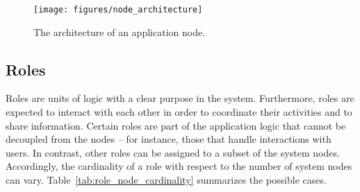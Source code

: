 





\begin{figure}[t!]
	\centering
	\texttt{[image: figures/node\_architecture]}
	\caption{The architecture of an application node.}
	\label{fig:node_architecture}
\end{figure}


\subsection{Roles}

Roles %
are units of logic with a clear purpose in the system. Furthermore, roles are expected to interact with each other in order to coordinate their activities and to share information. 
Certain roles are part of the application logic that cannot be decoupled from the nodes -- for instance, those that handle interactions with users. In contrast, other roles can be assigned to a subset of the system nodes. Accordingly, the cardinality of a role with respect to the number of system nodes can vary. 
Table~\ref{tab:role_node_cardinality} summarizes the possible cases.

